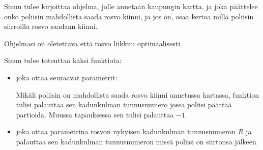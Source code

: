 \documentclass{boi2014-fi}
\begin{document}
    \Task
    Sinun tulee kirjoittaa ohjelma, jolle annetaan kaupungin kartta, ja joka
    päättelee onko poliisin mahdollista saada rosvo kiinni, ja jos on, osaa
    kertoa millä poliisin siirroilla rosvo saadaan kiinni.
    
    Ohjelmasi on oletettava että rosvo liikkuu optimaalisesti.

    \Implementation
    Sinun tulee toteuttaa kaksi funktiota:
    \begin{itemize}
        \item {} joka ottaa seuraavat parametrit:

        Mikäli poliisin on mahdollista saada rosvo kiinni annetussa kartassa,
        funktion  tulisi palauttaa sen kadunkulman tunnusnumero
        jossa poliisi päättää partioida. Muussa tapauksessa sen tulisi palauttaa $-1$.
        
        \item {} joka ottaa parametrina rosvon nykyisen kadunkulman
            tunnusnumeron $R$ ja palauttaa sen kadunkulman tunnusnumeron missä
            poliisi on siirtonsa jälkeen.
    \end{itemize}
\end{document}
